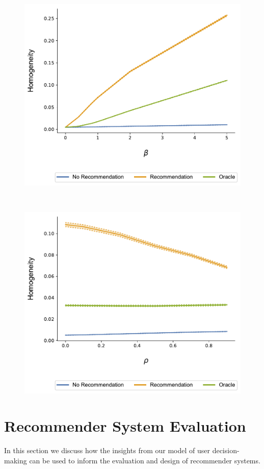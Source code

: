 \documentclass[sigconf, anonymous, review]{acmart}
\begin{document}
\begin{figure}[t]
\includegraphics[width=.8\linewidth]{figures/beta_homogeneity_N_200_T_20}
\label{fig:beta_homo}
\end{figure}
~

\begin{figure}[t]
\includegraphics[width=.8\linewidth]{figures/rho_homogeneity_N_200_T_20}
\label{fig:cor_homo}
\end{figure}

\section{Recommender System Evaluation}
In this section we discuss how the insights from our model of user decision-making can be used to inform the evaluation and design of recommender systems.
\par
\end{document}
